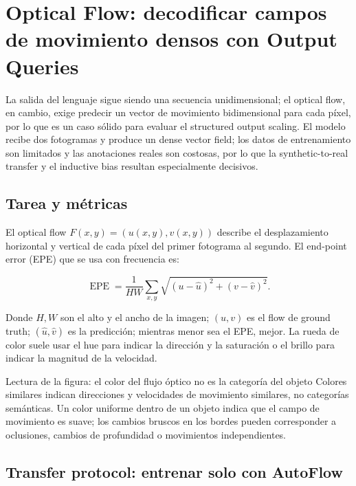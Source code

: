 \section{Optical Flow: decodificar campos de movimiento densos con Output Queries}

La salida del lenguaje sigue siendo una secuencia unidimensional; el optical flow, en cambio, exige predecir un vector de movimiento bidimensional para cada píxel, por lo que es un caso sólido para evaluar el structured output scaling. El modelo recibe dos fotogramas y produce un dense vector field; los datos de entrenamiento son limitados y las anotaciones reales son costosas, por lo que la synthetic-to-real transfer y el inductive bias resultan especialmente decisivos.

\subsection{Tarea y métricas}

El optical flow $F(x,y)=(u(x,y),v(x,y))$ describe el desplazamiento horizontal y vertical de cada píxel del primer fotograma al segundo. El end-point error (EPE) que se usa con frecuencia es:

\[
\operatorname{EPE}=\frac{1}{HW}\sum_{x,y}\sqrt{(u-\hat u)^2+(v-\hat v)^2}.
\]

Donde $H,W$ son el alto y el ancho de la imagen; $(u,v)$ es el flow de ground truth; $(\hat u,\hat v)$ es la predicción; mientras menor sea el EPE, mejor. La rueda de color suele usar el hue para indicar la dirección y la saturación o el brillo para indicar la magnitud de la velocidad.


\begin{knowledgebox}{Lectura de la figura: el color del flujo óptico no es la categoría del objeto}
Colores similares indican direcciones y velocidades de movimiento similares, no categorías semánticas. Un color uniforme dentro de un objeto indica que el campo de movimiento es suave; los cambios bruscos en los bordes pueden corresponder a oclusiones, cambios de profundidad o movimientos independientes.
\end{knowledgebox}

\subsection{Transfer protocol: entrenar solo con AutoFlow}

